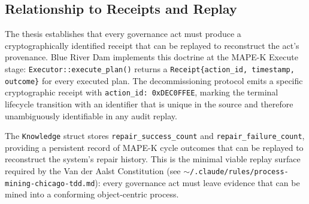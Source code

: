 \subsection{Relationship to Receipts and Replay}
\label{sec:blue-river-dam-lineage-receipts}

The thesis establishes that every governance act must produce a
cryptographically identified receipt that can be replayed to reconstruct the
act's provenance. Blue River Dam implements this doctrine at the MAPE-K
Execute stage: \texttt{Executor::execute\_plan()} returns a
\texttt{Receipt\{action\_id, timestamp, outcome\}} for every executed plan.
The decommissioning protocol emits a specific cryptographic receipt with
\texttt{action\_id: 0xDEC0FFEE}, marking the terminal lifecycle transition with
an identifier that is unique in the source and therefore unambiguously
identifiable in any audit replay.

The \texttt{Knowledge} struct stores \texttt{repair\_success\_count} and
\texttt{repair\_failure\_count}, providing a persistent record of MAPE-K cycle
outcomes that can be replayed to reconstruct the system's repair history. This
is the minimal viable replay surface required by the Van der Aalst Constitution
(see \texttt{$\sim$/.claude/rules/process-mining-chicago-tdd.md}): every
governance act must leave evidence that can be mined into a conforming
object-centric process.
